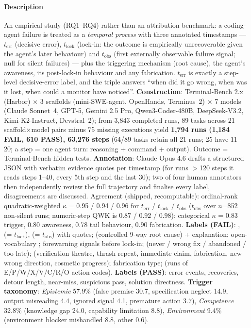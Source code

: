 \paragraph{Description} An empirical study (RQ1--RQ4) rather than an attribution benchmark: a coding-agent failure is treated as a \emph{temporal process} with three annotated timestamps --- $t_{\mathrm{err}}$ (decisive error), $t_{\mathrm{lock}}$ (lock-in: the outcome is empirically unrecoverable given the agent's later behaviour) and $t_{\mathrm{obs}}$ (first externally observable failure signal; null for silent failures) --- plus the triggering mechanism (root cause), the agent's awareness, its post-lock-in behaviour and any fabrication. $t_{\mathrm{err}}$ is exactly a step-level decisive-error label, and the triple answers ``when did it go wrong, when was it lost, when could a monitor have noticed''. \textbf{Construction}: Terminal-Bench 2.x (Harbor) $\times$ 3 scaffolds (mini-SWE-agent, OpenHands, Terminus~2) $\times$ 7 models (Claude Sonnet~4, GPT-5, Gemini 2.5 Pro, Qwen3-Coder-480B, DeepSeek-V3.2, Kimi-K2-Instruct, Devstral~2); from 3,843 completed runs, 89 tasks across 21 scaffold$\times$model pairs minus 75 missing executions yield \textbf{1,794 runs (1,184 FAIL, 610 PASS), 63,276 steps} (64/89 tasks retain all 21 runs; 25 have 11--20; a step = one agent turn: reasoning + command + output). Outcome = Terminal-Bench hidden tests. \textbf{Annotation}: Claude Opus 4.6 drafts a structured JSON with verbatim evidence quotes per timestamp (for runs $>$120 steps it reads steps 1--40, every 5th step and the last 30); two of four human annotators then independently review the full trajectory and finalise every label, disagreements are discussed. Agreement (shipped, recomputable): ordinal-rank quadratic-weighted $\kappa$ = 0.95 / 0.94 / 0.96 for $t_{\mathrm{err}}$ / $t_{\mathrm{lock}}$ / $t_{\mathrm{obs}}$ ($t_{\mathrm{obs}}$ over $n$=852 non-silent runs; numeric-step QWK is 0.87 / 0.92 / 0.98); categorical $\kappa$ = 0.83 trigger, 0.80 awareness, 0.78 tail behaviour, 0.90 fabrication. \textbf{Labels (FAIL)}: ,  (= $t_{\mathrm{lock}}$),  (= $t_{\mathrm{obs}}$) with  quotes;  (controlled 9-way root cause) + explanation; open-vocabulary ; forewarning signals before lock-in;  (never / wrong fix / abandoned / too late);  (verification theatre, thrash-repeat, immediate claim, fabrication, new wrong direction, cosmetic progress); fabrication type;  (runs of E/P/W/X/V/C/R/O action codes). \textbf{Labels (PASS)}: error events, recoveries, detour length, near-miss, suspicious pass, solution directness. \textbf{Trigger taxonomy}: \emph{Epistemic} 57.9\% (false premise 30.7, specification neglect 14.9, output misreading 4.4, ignored signal 4.1, premature action 3.7), \emph{Competence} 32.8\% (knowledge gap 24.0, capability limitation 8.8), \emph{Environment} 9.4\% (environment blocker mishandled 8.8, other 0.6).

